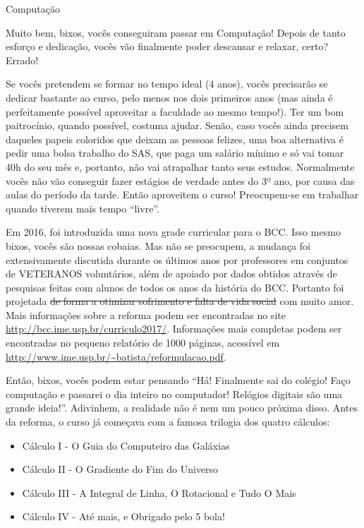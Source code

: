 \begin{subsecao}{Computação}

Muito bem, bixos, vocês conseguiram passar em Computação! Depois de tanto
esforço e dedicação, vocês vão finalmente poder descansar e relaxar, certo?
Errado!

Se vocês pretendem se formar no tempo ideal (4 anos), vocês precisarão se
dedicar bastante ao curso, pelo menos nos dois primeiros anos (mas ainda é
perfeitamente possível aproveitar a faculdade ao mesmo tempo!). Ter um bom
paitrocínio, quando possível, costuma ajudar. Senão, caso vocês ainda precisem
daqueles papeis coloridos que deixam as pessoas felizes, uma boa alternativa é
pedir uma bolsa trabalho do SAS, que paga um salário mínimo e só vai tomar
40h do seu mês e, portanto, não vai atrapalhar tanto seus estudos. Normalmente
vocês não vão conseguir fazer estágios de verdade antes do 3º ano, por causa
das aulas do período da tarde. Então aproveitem o curso! Preocupem-se em
trabalhar quando tiverem mais tempo ``livre''.

Em 2016, foi introduzida uma nova grade curricular para o
BCC. Isso mesmo bixos, vocês são nossas cobaias. Mas não se preocupem, a
mudança foi extensivamente discutida durante os últimos anos por professores em
conjuntos de VETERANOS voluntários, além de apoiado por dados obtidos através de
pesquisas feitas com alunos de todos os anos da história do BCC. Portanto foi
projetada \sout{de forma a otimizar sofrimento e falta de vida social} com muito
amor. Mais informações sobre a reforma podem ser encontradas no site
\url{http://bcc.ime.usp.br/curriculo2017/}. Informações mais completas podem ser
encontradas no pequeno relatório de 1000 páginas, acessível em
\url{http://www.ime.usp.br/~batista/reformulacao.pdf}.

Então, bixos, vocês podem estar pensando ``Há! Finalmente sai do colégio! Faço
computação e passarei o dia inteiro no computador! Relógios digitais são uma
grande ideia!''. Adivinhem, a realidade não é nem um pouco próxima disso. Antes
da reforma, o curso já começava com a famosa trilogia dos quatro cálculos:

\begin{itemize}
\item Cálculo I - O Guia do Computeiro das Galáxias
\item Cálculo II - O Gradiente do Fim do Universo
\item Cálculo III - A Integral de Linha, O Rotacional e Tudo O Mais
\item Cálculo IV - Até mais, e Obrigado pelo 5 bola!
\end{itemize}


\end{subsecao}

